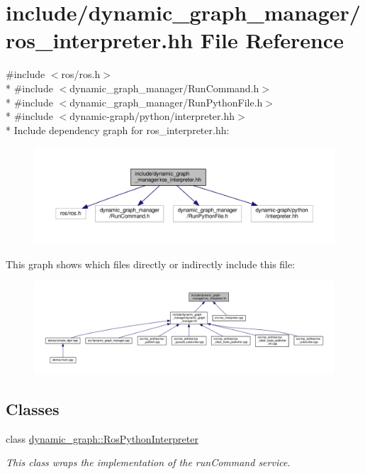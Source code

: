 \hypertarget{ros__interpreter_8hh}{}\section{include/dynamic\+\_\+graph\+\_\+manager/ros\+\_\+interpreter.hh File Reference}
\label{ros__interpreter_8hh}
{\ttfamily \#include $<$ros/ros.\+h$>$}\\*
{\ttfamily \#include $<$dynamic\+\_\+graph\+\_\+manager/\+Run\+Command.\+h$>$}\\*
{\ttfamily \#include $<$dynamic\+\_\+graph\+\_\+manager/\+Run\+Python\+File.\+h$>$}\\*
{\ttfamily \#include $<$dynamic-\/graph/python/interpreter.\+hh$>$}\\*
Include dependency graph for ros\+\_\+interpreter.\+hh\+:
\nopagebreak
\begin{figure}[H]
\begin{center}
\leavevmode
\includegraphics[width=350pt]{ros__interpreter_8hh__incl}
\end{center}
\end{figure}
This graph shows which files directly or indirectly include this file\+:
\nopagebreak
\begin{figure}[H]
\begin{center}
\leavevmode
\includegraphics[width=350pt]{ros__interpreter_8hh__dep__incl}
\end{center}
\end{figure}
\subsection*{Classes}
\begin{DoxyCompactItemize}
\item 
class \hyperlink{classdynamic__graph_1_1RosPythonInterpreter}{dynamic\+\_\+graph\+::\+Ros\+Python\+Interpreter}
\begin{DoxyCompactList}\small\item\em This class wraps the implementation of the run\+Command service. \end{DoxyCompactList}\end{DoxyCompactItemize}
